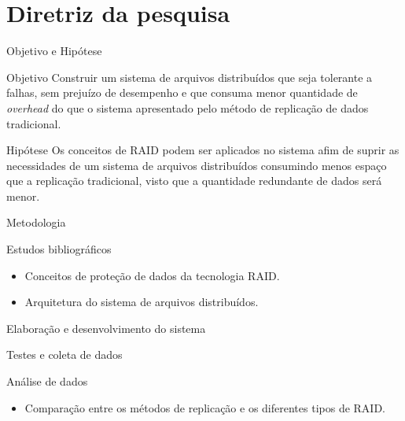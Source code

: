\section{Diretriz da pesquisa}

\begin{frame}{Objetivo e Hipótese}
	
	\begin{block}{Objetivo}
		Construir um sistema de arquivos distribuídos que seja tolerante a falhas, sem prejuízo de desempenho e que consuma menor quantidade de \textit{overhead} do que o sistema apresentado pelo método de replicação de dados tradicional.
		
	\end{block}
	
	\begin{block}{Hipótese}
		Os conceitos de RAID podem ser aplicados no sistema afim de suprir as necessidades de um sistema de arquivos distribuídos consumindo menos espaço que a replicação tradicional, visto que a quantidade redundante de dados será menor. 
		
	\end{block}
	
\end{frame}

\begin{frame}{Metodologia}
	
	\begin{block}{Estudos bibliográficos}
		\begin{itemize}
			\item Conceitos de proteção de dados da tecnologia RAID.
			\item Arquitetura do sistema de arquivos distribuídos.
		\end{itemize}
	\end{block}
	
	\begin{block}{Elaboração e desenvolvimento do sistema}
		
	\end{block}
	
	\begin{block}{Testes e coleta de dados}
		
	\end{block}
	
	\begin{block}{Análise de dados}
		\begin{itemize}
			\item Comparação entre os métodos de replicação e os diferentes tipos de RAID.
		\end{itemize}
		
	\end{block}
	
\end{frame}